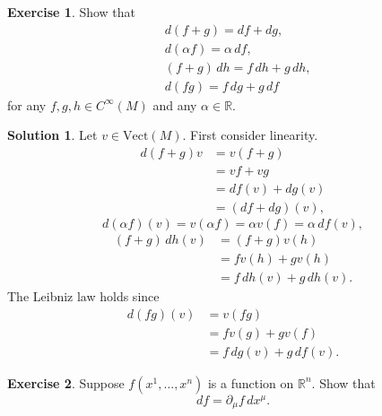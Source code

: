 \documentclass[11pt, a4paper]{report}
\theoremstyle{definition}
\newtheorem{ex}{Exercise}[part]
\newtheorem{sol}{Solution}[part]
\begin{document}
\begin{ex}

Show that
\begin{align*}
    & d(f + g) = df + dg, \\
    & d(\alpha f) = \alpha\, df, \\
    & (f + g) \, dh = f\, dh + g\, dh, \\
    & d(fg) = f \, dg + g\, df
\end{align*}
for any $f, g, h \in C^\infty(M)$ and any $\alpha \in \mathbb{R}$.

\end{ex}

\begin{sol}

Let $v \in \text{Vect}(M)$. First consider linearity.
\begin{align*}
    d(f + g)v &= v(f + g) \\
              &= vf + vg \\
              &= df(v) + dg(v) \\
              &= (df + dg)(v),
\end{align*}
\[
    d(\alpha f)(v) = v(\alpha f) = \alpha v(f) = \alpha \, df(v),
\]
\begin{align*}
    (f + g) \, dh(v) &= (f + g)v(h) \\
                     &= fv(h) + gv(h) \\
                     &= f\, dh(v) + g \, dh(v).
\end{align*}
The Leibniz law holds since
\begin{align*}
    d(fg)(v) &= v(fg) \\
             &= f v(g) + g v(f) \\
             &= f \, dg(v) + g \, df(v).
\end{align*}

\end{sol}

\begin{ex}

Suppose $f(x^1, \ldots, x^n)$ is a function on $\mathbb{R}^n$. Show that
\[
    df = \partial_\mu f \, dx^\mu.
\]

\end{ex}
\end{document}
